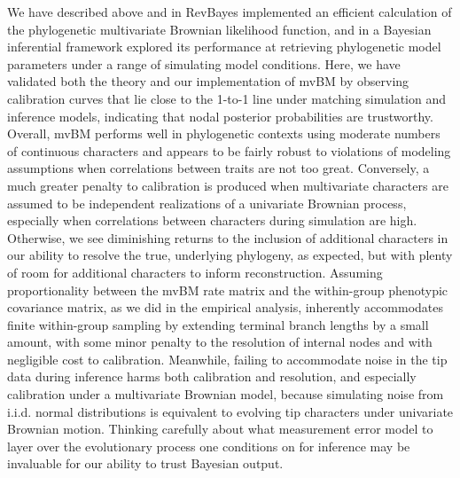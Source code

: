 \documentclass[10pt, twocolumn, twoside]{article}
\begin{document}
We have described above and in RevBayes implemented an efficient calculation of the phylogenetic multivariate Brownian likelihood function, and in a Bayesian inferential framework explored its performance at retrieving phylogenetic model parameters under a range of simulating model conditions. Here, we have validated both the theory and our implementation of mvBM by observing calibration curves that lie close to the 1-to-1 line under matching simulation and inference models, indicating that nodal posterior probabilities are trustworthy. Overall, mvBM performs well in phylogenetic contexts using moderate numbers of continuous characters and appears to be fairly robust to violations of modeling assumptions when correlations between traits are not too great. Conversely, a much greater penalty to calibration is produced when multivariate characters are assumed to be independent realizations of a univariate Brownian process, especially when correlations between characters during simulation are high. Otherwise, we see diminishing returns to the inclusion of additional characters in our ability to resolve the true, underlying phylogeny, as expected, but with plenty of room for additional characters to inform reconstruction. Assuming proportionality between the mvBM rate matrix and the within-group phenotypic covariance matrix, as we did in the empirical analysis, inherently accommodates finite within-group sampling by extending terminal branch lengths by a small amount, with some minor penalty to the resolution of internal nodes and with negligible cost to calibration. Meanwhile, failing to accommodate noise in the tip data during inference harms both calibration and resolution, and especially calibration under a multivariate Brownian model, because simulating noise from i.i.d. normal distributions is equivalent to evolving tip characters under univariate Brownian motion. Thinking carefully about what measurement error model to layer over the evolutionary process one conditions on for inference may be invaluable for our ability to trust Bayesian output.
\end{document}
